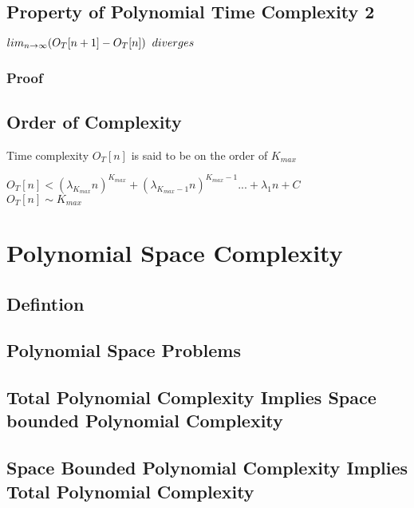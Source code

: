 \documentclass[11pt]{article}
\begin{document}
\subsection{Property of Polynomial Time Complexity 2}
\begin{center}
$
lim_{n \rightarrow \infty}( O_T[n+1] - O_T[n] ) \hspace{2mm} diverges
$
\end{center}
\subsubsection{Proof}




\subsection{Order of Complexity}
Time complexity $O_T[n]$ is said to be on the order of $K_{max}$
\begin{center}
$
O_T[n] < (\lambda_{K_{max}} n)^{K_{max}} + (\lambda_{K_{max}-1} n)^{K_{max}-1}... + \lambda_1 n + C
$
\\ \vspace{2mm}
$
O_T[n] \sim K_{max}
$
\end{center}


















\newpage
\section{Polynomial Space Complexity}
\subsection{Defintion}
\subsection{Polynomial Space Problems}
\subsection{Total Polynomial Complexity Implies Space bounded Polynomial Complexity}
\subsection{Space Bounded Polynomial Complexity Implies Total Polynomial Complexity}
\end{document}
